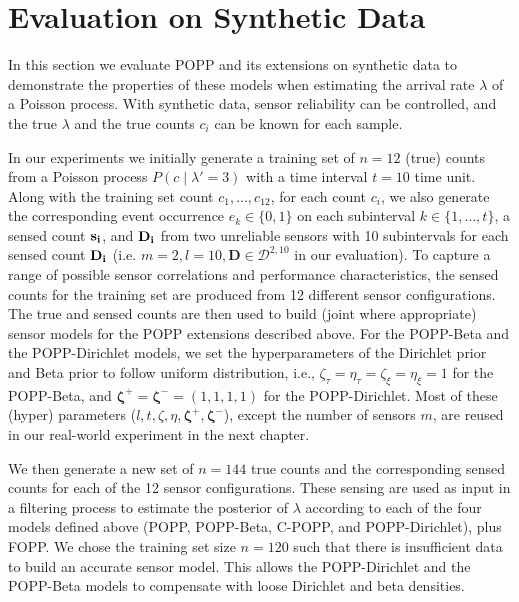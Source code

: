 
\section{Evaluation on Synthetic Data}
\label{sec:evasim}

In this section we evaluate POPP and its extensions on synthetic data to demonstrate the properties of these models when estimating the arrival rate $\lambda$ of a Poisson process. With synthetic data, sensor reliability can be controlled, and the true $\lambda$ and the true counts $c_i$ can be known for each sample.

In our experiments we initially generate a training set of $n=12$ (true) counts from a Poisson process $P(c \mid \lambda'=3)$ with a time interval $t = 10$ time unit. Along with the training set count $c_1, \ldots, c_{12}$, for each count $c_i$, we also generate the corresponding event occurrence $e_k \in \{0, 1\}$ on each subinterval $k \in \{1, \ldots, t\}$, a sensed count $\protect\mathbf{s_i}$, and $\protect\mathbf{D_i}$ from two unreliable sensors with 10 subintervals for each sensed count $\protect\mathbf{D_i}$ (i.e. $m=2, l=10, \mathbf{D} \in \mathcal D^{2, 10}$ in our evaluation). To capture a range of possible sensor correlations and performance characteristics, the sensed counts for the training set are produced from 12 different sensor configurations. The true and sensed counts are then used to build (joint where appropriate) sensor models for the POPP extensions described above. For the POPP-Beta and the POPP-Dirichlet models, we set the hyperparameters of the Dirichlet prior and Beta prior to follow uniform distribution, i.e., $\zeta_{\tau} = \eta_{\tau} = \zeta_{\xi} = \eta_{\xi} = 1$ for the POPP-Beta, and $\boldsymbol{\zeta^+} = \boldsymbol{\zeta^-} = (1, 1, 1, 1)$ for the POPP-Dirichlet. Most of these (hyper) parameters ($l, t, \zeta, \eta, \boldsymbol{\zeta^+}, \boldsymbol{\zeta^-}$), except the number of sensors $m$, are reused in our real-world experiment in the next chapter.

We then generate a new set of $n=144$ true counts and the corresponding sensed counts for each of the 12 sensor configurations. These sensing are used as input in a filtering process to estimate the posterior of $\lambda$ according to each of the four models defined above (POPP, POPP-Beta, C-POPP, and POPP-Dirichlet), plus FOPP.
% 
We chose the training set size $n=120$ such that there is insufficient data to build an accurate sensor model. This allows the POPP-Dirichlet and the POPP-Beta models to compensate with loose Dirichlet and beta densities. 

